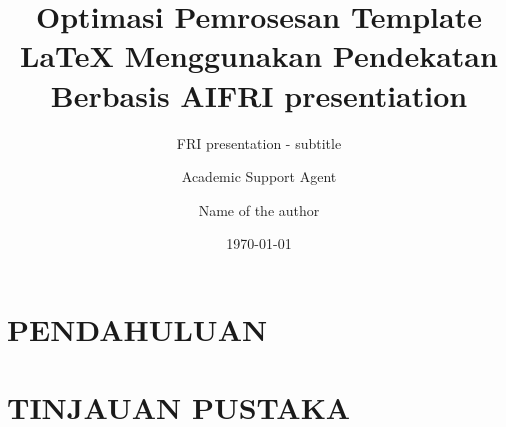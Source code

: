 \documentclass{beamer}
\title{Optimasi Pemrosesan Template LaTeX Menggunakan Pendekatan Berbasis AI}
\author{Academic Support Agent}
\date{\today}
\begin{document}
\maketitle

\begin{abstract}

\end{abstract}

\chapter{PENDAHULUAN}


\chapter{TINJAUAN PUSTAKA}


\usepackage[utf8]{inputenc}


\author{Name of the author}

\title{FRI presentiation}

\subtitle{FRI presentation - subtitle}


\end{document}
